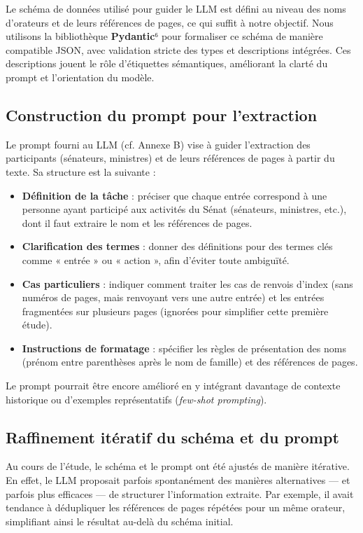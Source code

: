 Le schéma de données utilisé pour guider le LLM est défini au niveau des noms d’orateurs et de leurs références de pages, ce qui suffit à notre objectif. Nous utilisons la bibliothèque \textbf{Pydantic}⁶ pour formaliser ce schéma de manière compatible JSON, avec validation stricte des types et descriptions intégrées. Ces descriptions jouent le rôle d’étiquettes sémantiques, améliorant la clarté du prompt et l’orientation du modèle.

\subsection{Construction du prompt pour l’extraction}

Le prompt fourni au LLM (cf. Annexe B) vise à guider l’extraction des participants (sénateurs, ministres) et de leurs références de pages à partir du texte. Sa structure est la suivante :

\begin{itemize}
\item \textbf{Définition de la tâche} : préciser que chaque entrée correspond à une personne ayant participé aux activités du Sénat (sénateurs, ministres, etc.), dont il faut extraire le nom et les références de pages.
\item \textbf{Clarification des termes} : donner des définitions pour des termes clés comme « entrée » ou « action », afin d’éviter toute ambiguïté.
\item \textbf{Cas particuliers} : indiquer comment traiter les cas de renvois d’index (sans numéros de pages, mais renvoyant vers une autre entrée) et les entrées fragmentées sur plusieurs pages (ignorées pour simplifier cette première étude).
\item \textbf{Instructions de formatage} : spécifier les règles de présentation des noms (prénom entre parenthèses après le nom de famille) et des références de pages.

\end{itemize}
Le prompt pourrait être encore amélioré en y intégrant davantage de contexte historique ou d’exemples représentatifs (\emph{few-shot prompting}).

\subsection{Raffinement itératif du schéma et du prompt}

Au cours de l’étude, le schéma et le prompt ont été ajustés de manière itérative. En effet, le LLM proposait parfois spontanément des manières alternatives — et parfois plus efficaces — de structurer l’information extraite. Par exemple, il avait tendance à dédupliquer les références de pages répétées pour un même orateur, simplifiant ainsi le résultat au-delà du schéma initial.

